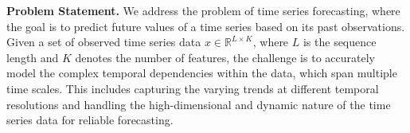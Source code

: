 \textbf{Problem Statement.}
%
We address the problem of time series forecasting, where the goal is to predict future values of a time series based on its past observations. Given a set of observed time series data $x \in \mathbb{R}^{L \times K}$, where $L$ is the sequence length and $K$ denotes the number of features, the challenge is to accurately model the complex temporal dependencies within the data, which span multiple time scales. This includes capturing the varying trends at different temporal resolutions and handling the high-dimensional and dynamic nature of the time series data for reliable forecasting.
